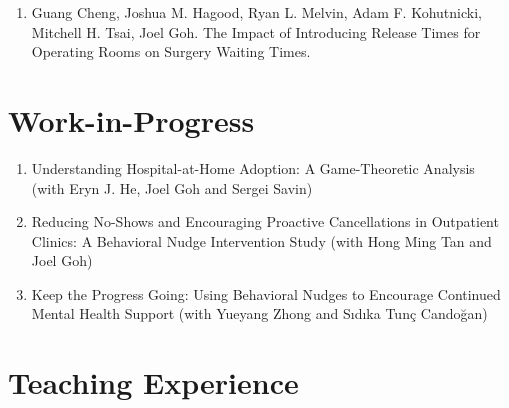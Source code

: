 \documentclass[12pt, a4paper]{article}
\begin{document}
{\begin{enumerate}[leftmargin=30pt, resume]
	\begin{itemize}
		\item {\footnotesize Finalist, 2025 POMS PITM Best Student Paper Competition}
		\item {\footnotesize Select for presentation at Workshop on Empirical Operations Management 2025}
	\end{itemize}

	\item Guang Cheng, Joshua M. Hagood, Ryan L. Melvin, Adam F. Kohutnicki, Mitchell H. Tsai, Joel Goh. The Impact of Introducing Release Times for Operating Rooms on Surgery Waiting Times.

\end{enumerate}




\section*{Work-in-Progress}

\begin{enumerate}[leftmargin=30pt, resume]

	\item Understanding Hospital-at-Home Adoption: A Game-Theoretic Analysis (with Eryn J. He, Joel Goh and Sergei Savin)
	
	\item Reducing No-Shows and Encouraging Proactive Cancellations in Outpatient Clinics: A Behavioral Nudge Intervention Study (with Hong Ming Tan and Joel Goh)
	
	\item Keep the Progress Going: Using Behavioral Nudges to Encourage Continued Mental Health Support (with Yueyang Zhong and S\i{}d\i{}ka Tun\c{c} Cando\u{g}an) 
	
\end{enumerate}




\section*{Teaching Experience}
\begin{itemize}


\end{itemize}}
\end{document}
